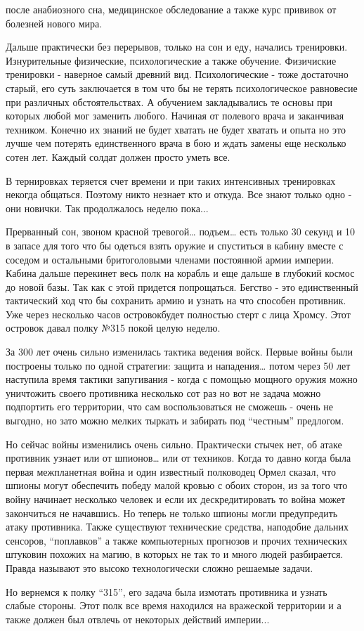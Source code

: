после анабиозного сна, медицинское обследование а также курс прививок от болезней нового мира.
\par
Дальше практически без перерывов, только на сон и еду, начались тренировки.
Изнурительные физические, психологические а также обучение. 
Физичиские тренировки - наверное самый древний вид. Психологические - тоже достаточно старый,
его суть заключается в том что бы не терять психологическое равновесие
при различных обстоятельствах. А обучением закладывались те основы
при которых любой мог заменить любого. Начиная от полевого врача и заканчивая 
техником. Конечно их знаний не будет хватать не будет хватать и опыта но это лучше
чем потерять единственного врача в бою и ждать замены еще несколько сотен лет.
Каждый солдат должен просто уметь все.
\par
В тернировках теряется счет времени и при таких интенсивных тренировках некогда общаться.
Поэтому никто незнает кто и откуда. Все знают только одно - они новички.
Так продолжалось неделю пока...
\par
Прерванный сон, звоном красной тревогой… подъем… есть только 30 секунд и
10 в запасе для того что бы одеться взять оружие и спуститься в кабину
вместе с соседом и остальными бритоголовыми членами постоянной армии империи.
Кабина дальше перекинет весь полк на корабль и еще дальше в глубокий
космос до новой базы. Так как с этой придется попрощаться. Бегство - это
единственный тактический ход что бы сохранить армию и узнать на что
способен противник. Уже через несколько часов островокбудет полностью
стерт с лица Хромсу. Этот островок давал полку №315 покой целую неделю.
\par
За 300 лет очень сильно изменилась тактика ведения войск. Первые войны
были построены только по одной стратегии: защита и нападения… потом через
50 лет наступила время тактики запугивания - когда с помощью мощного оружия
можно уничтожить своего противника несколько сот раз но вот не задача
можно подпортить его территории, что сам воспользоваться не сможешь -
очень не выгодно, но зато можно мелких тыркать и забирать
под “честным” предлогом. 
\par
Но сейчас войны изменились очень сильно. Практически стычек нет, об
атаке противник узнает или от шпионов… или от техников. Когда то давно
когда была первая межпланетная война и один известный полководец Ормел
сказал, что шпионы могут обеспечить победу малой кровью с обоих сторон,
из за того что войну начинает несколько человек и если их
дескредитировать то война может закончиться не начавшись.
Но теперь не только шпионы могли предупредить атаку противника.
Также существуют технические средства, наподобие дальних сенсоров,
“поплавков” а также  компьютерных прогнозов и прочих технических
штуковин похожих на магию, в которых не так то и много людей разбирается.
Правда называют это высоко технологически сложно решаемые задачи.
\par
Но вернемся к полку “315”, его задача была измотать противника и узнать
слабые стороны. Этот полк все время находился на вражеской территории
и а также должен был отвлечь от некоторых действий империи...
\par

